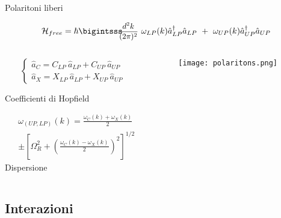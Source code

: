 \documentclass[10pt]{beamer}
\newcommand{\ham}{\mathcal{H}}
\newcommand{\intk}{ \bigintsss \!\!\! \text{\small{$\frac{d^2 k}{(2\pi)^2}$}}~}
\newcommand{\oa}{\hat{a}}
\newcommand{\lp}{_{LP}}
\newcommand{\up}{_{UP}}
\begin{document}
\begin{frame}{Polaritoni liberi}

\begin{equation*}
 \ham_{free} = \hbar \intk \omega_{LP} (k) \oa_{LP}^\dagger \oa_{LP} ~ + ~ \omega_{UP} (k) \oa_{UP}^\dagger \oa_{UP}
\end{equation*}

\begin{minipage}{\textwidth}
\begin{columns}
\footnotesize{
  \begin{column}{.4\textwidth}
  
   $$\begin{cases}
	\oa_C = C\lp \ \oa\lp + C\up \ \oa\up \\
	\oa_X = X\lp \ \oa\lp + X\up \ \oa\up
     \end{cases}
   $$
   
   Coefficienti di Hopfield

   \begin{equation*}
    \begin{align}
      &\omega_{(UP,LP)} (k) = \frac{\omega_C (k) + \omega_X (k)}{2} \\
			     &\pm \left[\Omega_R^2 + \left(\frac{\omega_C (k) - \omega_X (k)}{2}\right)^2\right]^{1/2}
    \end{align}
   \end{equation*}
   Dispersione
  \end{column}
  }
  \hspace{.5cm}
  \begin{column}{.55\textwidth}
   \begin{figure}[h]
    \texttt{[image: polaritons.png]}
   \end{figure}

  \end{column}
\end{columns}
\end{minipage}

 

  
  

\end{frame}



\subsection{Interazioni}
\end{document}

